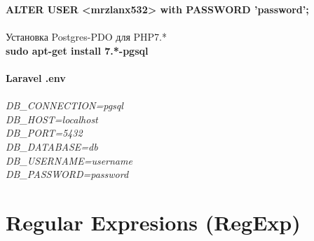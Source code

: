 \documentclass[a4paper, 12px]{article}
\begin{document}
\textbf{ALTER USER <mrzlanx532> with PASSWORD 'password';}\\\\
Установка Postgres-PDO для PHP7.*\\

\textbf{sudo apt-get install 7.*-pgsql}\\\\
\textbf{Laravel .env}\\\\
\textit{	
DB\_CONNECTION=pgsql\\
DB\_HOST=localhost\\
DB\_PORT=5432\\
DB\_DATABASE=db\\
DB\_USERNAME=username\\
DB\_PASSWORD=password\\}

\section{Regular Expresions (RegExp)}
\end{document}
